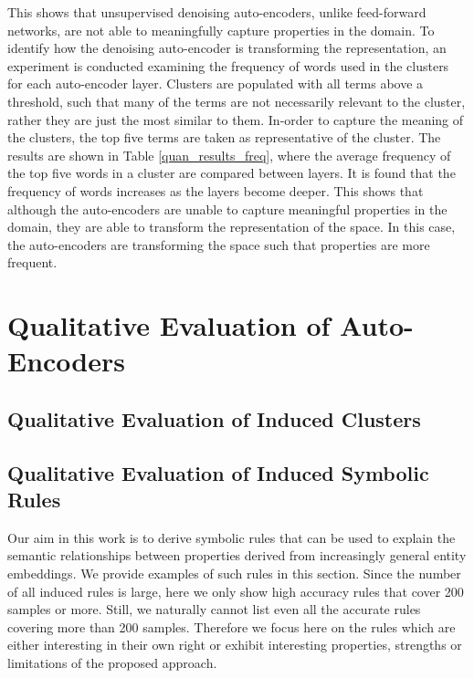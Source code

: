 This shows that unsupervised denoising auto-encoders, unlike feed-forward networks, are not able to meaningfully capture properties in the domain. To identify how the denoising auto-encoder is transforming the representation, an experiment is conducted examining the frequency of words used in the clusters for each auto-encoder layer. Clusters are populated with all terms above a threshold, such that many of the terms are not necessarily relevant to the cluster, rather they are just the most similar to them. In-order to capture the meaning of the clusters, the top five terms are taken as representative of the cluster. The results are shown in Table \ref{quan_results_freq}, where the average frequency of the top five words in a cluster are compared between layers. It is found that the frequency of words increases as the layers become deeper. This shows that although the auto-encoders are unable to capture meaningful properties in the domain, they are able to transform the representation of the space. In this case, the auto-encoders are transforming the space such that properties are more frequent. 



\section{Qualitative Evaluation of Auto-Encoders}\label{auto-encoder-qual}

\subsection{Qualitative Evaluation of Induced Clusters} %



\subsection{Qualitative Evaluation of Induced Symbolic Rules}

Our aim in this work is to derive symbolic rules that can be used to explain the semantic relationships between properties derived from increasingly general entity embeddings. We provide examples of such rules in this section. Since the number of all induced rules is large, here we only show high accuracy rules that cover 200 samples or more.  Still, we naturally cannot list even all the accurate rules covering more than 200 samples. Therefore we focus here on the rules which are either interesting in their own right or exhibit interesting properties, strengths or limitations of the proposed approach. 

